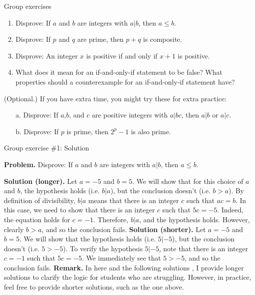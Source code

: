 \documentclass[10pt]{beamer}
\begin{document}
\begin{frame}{Group exercises}
\begin{enumerate}
	\item Disprove: If $a$ and $b$ are integers with $a|b$, then $a \leq b$.
	\item Disprove: If $p$ and $q$ are prime, then $p+q$ is composite.
	\item Disprove: An integer $x$ is positive if and only if $x+1$ is positive.
	\item What does it mean for an if-and-only-if statement to be false? What properties should a counterexample for an if-and-only-if statement have?
\end{enumerate}

\vfill  \vfill 
(Optional.) If you have extra time, you might try these for extra practice:
\vspace{-0.5cm}
\begin{enumerate}
	\item[a.] Disprove: If $a$,$b$, and $c$ are positive integers with $a|bc$, then $a|b$ or $a|c$.
	\item[b.] Disprove: If $p$ is prime, then $2^p-1$ is also prime.
\end{enumerate}

\end{frame}


\begin{frame}{Group exercise \#1: Solution}

\textbf{Problem.} Disprove: If $a$ and $b$ are integers with $a|b$, then $a \leq b$.
\vfill 

\textbf{Solution (longer).} Let $a=-5$ and $b=5$. We will show that for this choice of $a$ and $b$, the hypothesis holds (i.e. $b|a$), but the conclusion doesn't (i.e. $b>a$).  By definition of divisibility, $b|a$ means that there is an integer $c$ such that $ac =b$. In this case, we need to show that there is an integer $c$ such that  $5c=-5$.  Indeed, the equation holds for $c=-1$.  Therefore, $b|a$, and the hypothesis holds.  However, clearly $b>a$, and so the conclusion fails. 
\vfill 
\textbf{Solution (shorter).} Let $a=-5$ and $b=5$. We will show that the hypothesis holds (i.e. $5|-5$), but the conclusion doesn't (i.e. $5>-5$).  To verify the hypothesis $5|-5$, note that there is an integer $c=-1$ such that  $5c=-5$.  We immediately see that $5>-5$, and so the conclusion fails.
\vfill 
\textbf{Remark.} In here and the following solutions , I provide longer solutions to clarify the logic for students who are struggling. However, in practice, feel free to provide shorter solutions, such as the one above.
\end{frame}
\end{document}
